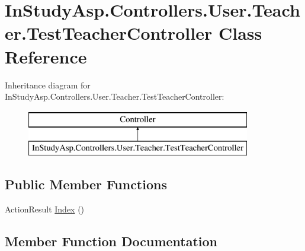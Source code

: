 \hypertarget{class_in_study_asp_1_1_controllers_1_1_user_1_1_teacher_1_1_test_teacher_controller}{}\section{In\+Study\+Asp.\+Controllers.\+User.\+Teacher.\+Test\+Teacher\+Controller Class Reference}
\label{class_in_study_asp_1_1_controllers_1_1_user_1_1_teacher_1_1_test_teacher_controller}
Inheritance diagram for In\+Study\+Asp.\+Controllers.\+User.\+Teacher.\+Test\+Teacher\+Controller\+:\begin{figure}[H]
\begin{center}
\leavevmode
\includegraphics[height=2.000000cm]{class_in_study_asp_1_1_controllers_1_1_user_1_1_teacher_1_1_test_teacher_controller}
\end{center}
\end{figure}
\subsection*{Public Member Functions}
\begin{DoxyCompactItemize}
\item 
Action\+Result \hyperlink{class_in_study_asp_1_1_controllers_1_1_user_1_1_teacher_1_1_test_teacher_controller_a833a71b3ec97cabf1aae37da825c4c7a}{Index} ()
\end{DoxyCompactItemize}


\subsection{Member Function Documentation}
\mbox{\label{class_in_study_asp_1_1_controllers_1_1_user_1_1_teacher_1_1_test_teacher_controller_a833a71b3ec97cabf1aae37da825c4c7a}} 
